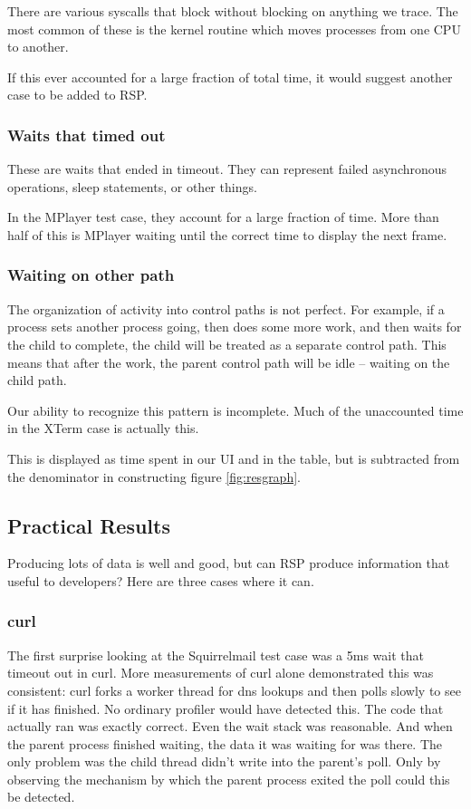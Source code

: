 \documentclass[10pt]{article}
\begin{document}
There are various syscalls that block without blocking on anything we trace.  The most common of these is the kernel routine which moves processes from one CPU to another.

If this ever accounted for a large fraction of total time, it would suggest another case to be added to RSP.

\subsubsection{Waits that timed out}

These are waits that ended in timeout.  They can represent failed asynchronous operations, sleep statements, or other things.

In the MPlayer test case, they account for a large fraction of time.  More than half of this is MPlayer waiting until the correct time to display the next frame.

\subsubsection{Waiting on other path}

The organization of activity into control paths is not perfect.  For example, if a process sets another process going, then does some more work, and then waits for the child to complete, the child will be treated as a separate control path.  This means that after the work, the parent control path will be idle -- waiting on the child path.

Our ability to recognize this pattern is incomplete.  Much of the unaccounted time in the XTerm case is actually this.

This is displayed as time spent in our UI and in the table, but is subtracted from the denominator in constructing figure \ref{fig:resgraph}.

\subsection{Practical Results}

Producing lots of data is well and good, but can RSP produce information that useful to developers?  Here are three cases where it can.

\subsubsection{curl}

The first surprise looking at the Squirrelmail test case was a 5ms wait that timeout out in curl.  More measurements of curl alone demonstrated this was consistent: curl forks a worker thread for dns lookups and then polls slowly to see if it has finished.  No ordinary profiler would have detected this.  The code that actually ran was exactly correct.  Even the wait stack was reasonable.  And when the parent process finished waiting, the data it was waiting for was there.  The only problem was the child thread didn't write into the parent's poll.  Only by observing the mechanism by which the parent process exited the poll could this be detected.
\end{document}
